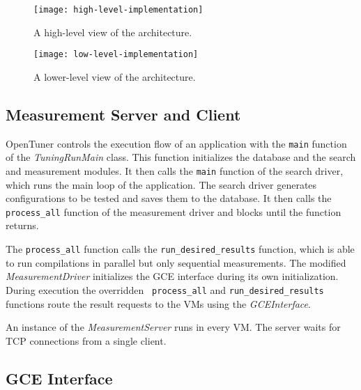 \begin{figure}[htpb]
    \centering
    \begin{minipage}{.45\textwidth}
        \centering
        \texttt{[image: high-level-implementation]}
        \caption{A high-level view of the architecture.}
        \label{fig:high-level}
    \end{minipage}%
    \hfill
    \begin{minipage}{.45\textwidth}
        \centering
        \texttt{[image: low-level-implementation]}
        \caption{A lower-level view of the architecture.}
        \label{fig:low-level}
    \end{minipage}%
    \label{fig:archs}
\end{figure}

\subsection{Measurement Server and Client}
\label{sec:server-client}

OpenTuner controls the execution flow of an application with the
\texttt{\footnotesize main} function of the \emph{TuningRunMain} class. This
function initializes the database and the search and measurement modules. It
then calls the \texttt{\footnotesize main} function of the search driver, which
runs the main loop of the application.  The search driver generates
configurations to be tested and saves them to the database. It then calls the
\texttt{\footnotesize process\_all} function of the measurement driver and
blocks until the function returns.

The \texttt{\footnotesize process\_all} function calls the
\texttt{\footnotesize run\_desired\_results} function, which is able to run
compilations in parallel but only sequential measurements.  The modified
\emph{MeasurementDriver} initializes the GCE interface during its own
initialization. During execution the overridden \texttt{\footnotesize
process\_all} and \texttt{\footnotesize run\_desired\_results} functions route
the result requests to the VMs using the \emph{GCEInterface}.

An instance of the \emph{MeasurementServer} runs in every VM. The
server waits for TCP connections from a single client.

\subsection{GCE Interface}
\label{sec:gce}

